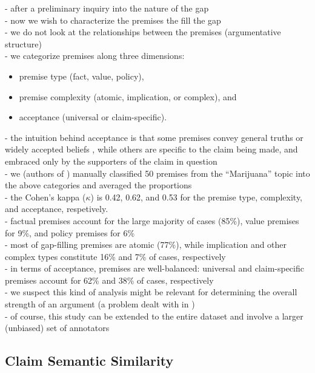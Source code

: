 - after a preliminary inquiry into the nature of the gap \\
- now we wish to characterize the premises the fill the gap \\
- we do not look at the relationships between the premises (argumentative
structure) \\
- we categorize premises along three dimensions: 
\begin{itemize}
\item premise type (fact, value, policy), 
\item premise complexity (atomic, implication, or complex), and
\item acceptance (universal or claim-specific).
\end{itemize}
- the intuition behind acceptance is that some premises convey general truths or widely
accepted beliefs , while others are specific to the claim being made, and embraced
only by the supporters of the claim in question \\
- we (authors of \citep{boltuzic2016fill}) manually classified 50 premises from the ``Marijuana''
topic into the above categories and averaged the proportions \\
- the Cohen's kappa ($\kappa$) \citep{cohen1960coefficient} is 0.42, 
0.62, and 0.53 for the premise type, complexity, and acceptance, respetively. \\
- factual premises account for the large majority of cases (85\%), value premises
for 9\%, and policy premises for 6\% \\
- most of gap-filling premises are atomic (77\%), while implication and other complex
types constitute 16\% and 7\% of cases, respectively \\
- in terms of acceptance, premises are well-balanced: universal and claim-specific 
premises account for 62\% and 38\% of cases, respectively \\
- we suspect this kind of analysis might be relevant for determining the overall 
strength of an argument (a problem dealt with in \citep{park2014identifying}) \\
- of course, this study can be extended to the entire dataset and involve
a larger (unbiased) set of annotators \\

\subsection{Claim Semantic Similarity}


